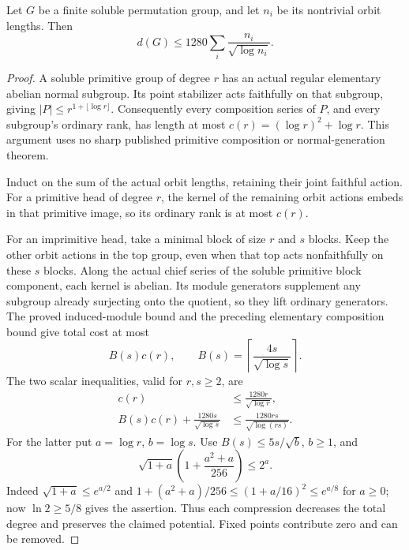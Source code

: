 \begin{lemma}
\label{lem:soluble-orbit-generation}
Let $G$ be a finite soluble permutation group, and let $n_i$ be its
nontrivial orbit lengths. Then
\[
 d(G)\leq1280\sum_i\frac{n_i}{\sqrt{\log n_i}}.
\]
\end{lemma}
\begin{proof}
A soluble primitive group of degree $r$ has an actual regular elementary
abelian normal subgroup. Its point stabilizer acts faithfully on that
subgroup, giving $|P|\leq r^{1+\lfloor\log r\rfloor}$. Consequently every
composition series of $P$, and every subgroup's ordinary rank, has length
at most $c(r)=(\log r)^2+\log r$. This argument uses no sharp published
primitive composition or normal-generation theorem.

Induct on the sum of the actual orbit lengths, retaining their joint
faithful action. For a primitive head of degree $r$, the kernel of the
remaining orbit actions embeds in that primitive image, so its ordinary
rank is at most $c(r)$.

For an imprimitive head, take a minimal block of size $r$ and $s$ blocks.
Keep the other orbit actions in the top group, even when that top acts
nonfaithfully on these $s$ blocks. Along the actual chief series of the
soluble primitive block component, each kernel is abelian. Its module
generators supplement any subgroup already surjecting onto the quotient,
so they lift ordinary generators. The proved induced-module bound and
the preceding elementary composition bound give total cost at most
\[
 B(s)c(r),\qquad
 B(s)=\left\lceil\frac{4s}{\sqrt{\log s}}\right\rceil.
\]
The two scalar inequalities, valid for $r,s\geq2$, are
\begin{align*}
 c(r)&\leq\frac{1280r}{\sqrt{\log r}},\\
 B(s)c(r)+\frac{1280s}{\sqrt{\log s}}
 &\leq\frac{1280rs}{\sqrt{\log(rs)}}.
\end{align*}
For the latter put $a=\log r$, $b=\log s$. Use $B(s)\leq5s/\sqrt b$,
$b\geq1$, and
\[
 \sqrt{1+a}\left(1+\frac{a^2+a}{256}\right)\leq2^a.
\]
Indeed $\sqrt{1+a}\leq e^{a/2}$ and
$1+(a^2+a)/256\leq(1+a/16)^2\leq e^{a/8}$ for $a\geq0$;
now $\ln2\geq5/8$ gives the assertion.
Thus each compression decreases the total degree and preserves the
claimed potential. Fixed points contribute zero and can be removed.
\end{proof}

